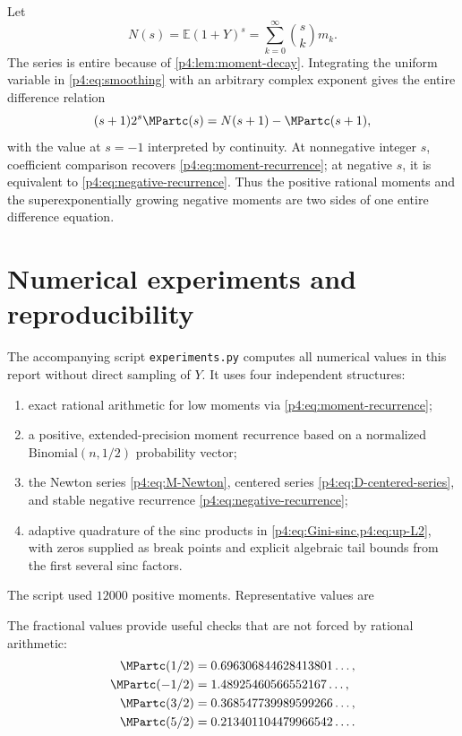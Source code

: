 \documentclass[11pt,oneside]{article}
\theoremstyle{definition}
\theoremstyle{remark}
\newcommand{\E}{\mathbb E}
\newcommand{\1}{\mathbf 1}
\begin{document}
Let
\begin{equation}\label{p4:eq:Ndef}
 N(s)=\E(1+Y)^s
 =\sum_{k=0}^{\infty}\binom skm_k.
\end{equation}
The series is entire because of \cref{p4:lem:moment-decay}.  Integrating the uniform
variable in \cref{p4:eq:smoothing} with an arbitrary complex exponent gives the entire
difference relation
\begin{equation}\label{p4:eq:M-difference}
 (s+1)2^s\MPartc(s)=N(s+1)-\MPartc(s+1),
\end{equation}
with the value at \(s=-1\) interpreted by continuity.  At nonnegative integer \(s\),
coefficient comparison recovers \cref{p4:eq:moment-recurrence}; at negative \(s\), it is
equivalent to \cref{p4:eq:negative-recurrence}.  Thus the positive rational moments and
the superexponentially growing negative moments are two sides of one entire
difference equation.

\section{Numerical experiments and reproducibility}\label{p4:sec:numerics}

The accompanying script \texttt{experiments.py} computes all numerical values in this
report without direct sampling of \(Y\).  It uses four independent structures:
\begin{enumerate}
\item exact rational arithmetic for low moments via \cref{p4:eq:moment-recurrence};
\item a positive, extended-precision moment recurrence based on a normalized
\(\mathrm{Binomial}(n,1/2)\) probability vector;
\item the Newton series \cref{p4:eq:M-Newton}, centered series
\cref{p4:eq:D-centered-series}, and stable negative recurrence
\cref{p4:eq:negative-recurrence};
\item adaptive quadrature of the sinc products in \cref{p4:eq:Gini-sinc,p4:eq:up-L2}, with
zeros supplied as break points and explicit algebraic tail bounds from the first several
sinc factors.
\end{enumerate}

The script used \(12000\) positive moments.  Representative values are
\begin{center}

\end{center}
The fractional values provide useful checks that are not forced by rational arithmetic:
\begin{align}
 \MPartc(1/2)&=0.696306844628413801\ldots,\nonumber\\
 \MPartc(-1/2)&=1.48925460566552167\ldots,\nonumber\\
 \MPartc(3/2)&=0.368547739989599266\ldots,\nonumber\\
 \MPartc(5/2)&=0.213401104479966542\ldots.\label{p4:eq:fractional-numerics}
\end{align}
\end{document}
